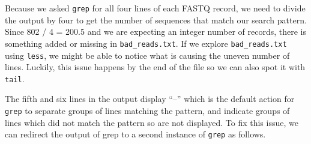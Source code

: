 \documentclass[
  letterpaper,
  DIV=11,
  numbers=noendperiod]{scrreprt}
\newenvironment{Shaded}{\begin{snugshade}}{\end{snugshade}}
\newcommand{\AttributeTok}[1]{\textcolor[rgb]{0.40,0.45,0.13}{#1}}
\newcommand{\CommentTok}[1]{\textcolor[rgb]{0.37,0.37,0.37}{#1}}
\newcommand{\ExtensionTok}[1]{\textcolor[rgb]{0.00,0.23,0.31}{#1}}
\newcommand{\FunctionTok}[1]{\textcolor[rgb]{0.28,0.35,0.67}{#1}}
\newcommand{\KeywordTok}[1]{\textcolor[rgb]{0.00,0.23,0.31}{\textbf{#1}}}
\newcommand{\NormalTok}[1]{\textcolor[rgb]{0.00,0.23,0.31}{#1}}
\newcommand{\OperatorTok}[1]{\textcolor[rgb]{0.37,0.37,0.37}{#1}}
\begin{document}
\begin{Shaded}
\end{Shaded}

Because we asked \texttt{grep} for all four lines of each FASTQ record,
we need to divide the output by four to get the number of sequences that
match our search pattern. Since 802 / 4 = 200.5 and we are expecting an
integer number of records, there is something added or missing in
\texttt{bad\_reads.txt}. If we explore \texttt{bad\_reads.txt} using
\texttt{less}, we might be able to notice what is causing the uneven
number of lines. Luckily, this issue happens by the end of the file so
we can also spot it with \texttt{tail}.

\begin{Shaded}
\end{Shaded}

The fifth and six lines in the output display ``--'' which is the
default action for \texttt{grep} to separate groups of lines matching
the pattern, and indicate groups of lines which did not match the
pattern so are not displayed. To fix this issue, we can redirect the
output of grep to a second instance of \texttt{grep} as follows.
\end{document}
